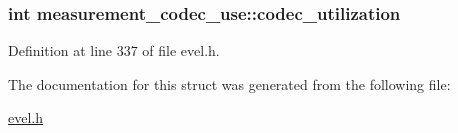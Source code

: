 \hypertarget{structmeasurement__codec__use_aedcede04d123d6cdb450ac8faf35bf35}{}
\subsubsection[{codec\+\_\+utilization}]{\setlength{\rightskip}{0pt plus 5cm}int measurement\+\_\+codec\+\_\+use\+::codec\+\_\+utilization}\label{structmeasurement__codec__use_aedcede04d123d6cdb450ac8faf35bf35}


Definition at line 337 of file evel.\+h.



The documentation for this struct was generated from the following file\+:\begin{DoxyCompactItemize}
\item 
\hyperlink{evel_8h}{evel.\+h}\end{DoxyCompactItemize}
